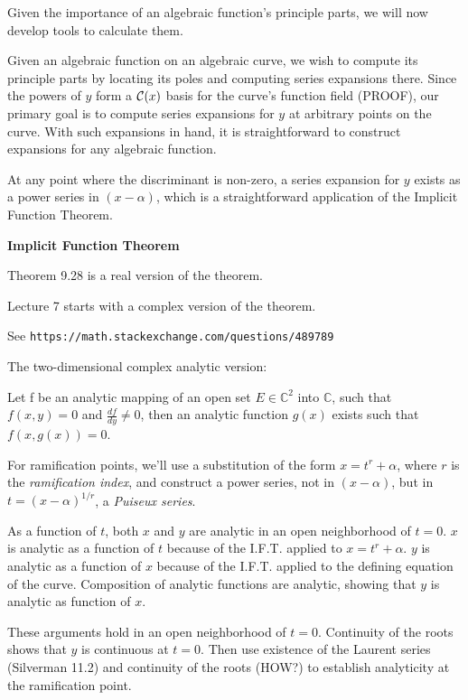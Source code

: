 \endtheorem

Given the importance of an algebraic function's principle parts, we will
now develop tools to calculate them.


Given an algebraic function on an algebraic curve, we wish to compute
its principle parts by locating its poles and computing series
expansions there.  Since the powers of $y$ form a ${\cal C}(x)$ basis
for the curve's function field (PROOF), our primary goal is to compute
series expansions for $y$ at arbitrary points on the curve.  With such
expansions in hand, it is straightforward to construct expansions for
any algebraic function.

At any point where the discriminant is non-zero, a series expansion
for $y$ exists as a power series in $(x-\alpha)$, which is a
straightforward application of the Implicit Function Theorem.

\theorem
{\bf Implicit Function Theorem}
\label{implicit function theorem}

\cite{baby rudin} Theorem 9.28 is a real version of the theorem.

\cite{guillemin} Lecture 7 starts with a complex version of the theorem.

See {\tt https://math.stackexchange.com/questions/489789}

The two-dimensional complex analytic version:

Let f be an analytic
mapping of an open set $E \in {\mathbb C}^2$ into ${\mathbb C}$, such
that $f(x,y)=0$ and $\frac{df}{dy} \ne 0$, then an analytic
function $g(x)$ exists such that $f(x,g(x))=0$.
\endtheorem


For ramification points, we'll use a substitution of the form
$x=t^r+\alpha$, where $r$ is the {\it ramification index}, and
construct a power series, not in $(x-\alpha)$, but in
$t=(x-\alpha)^{1/r}$, a {\it Puiseux series}.

As a function of $t$, both $x$ and $y$ are analytic in an open
neighborhood of $t=0$.  $x$ is analytic as a function of $t$ because
of the I.F.T. applied to $x=t^r+\alpha$.  $y$ is analytic as a
function of $x$ because of the I.F.T. applied to the defining equation
of the curve.  Composition of analytic functions are analytic,
showing that $y$ is analytic as function of $x$.

These arguments hold in an open neighborhood of $t=0$.  Continuity of
the roots shows that $y$ is continuous at $t=0$.  Then use existence
of the Laurent series (Silverman 11.2) and continuity of the roots
(HOW?) to establish analyticity at the ramification point.

